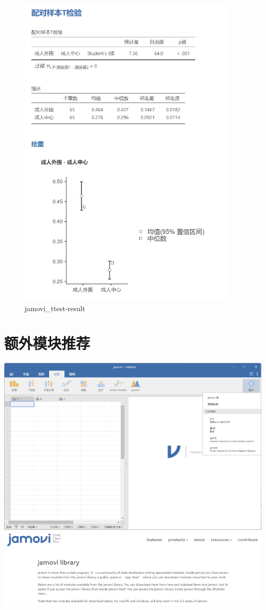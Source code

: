 \documentclass[
]{book}
\begin{document}
\begin{figure}
\centering
\includegraphics{img/jamovi/ttest-results.png}
\caption{jamovi\_ttest-result}
\end{figure}

\section{额外模块推荐}\label{ux989dux5916ux6a21ux5757ux63a8ux8350}

\includegraphics{img/jamovi/modules.png}\\
\includegraphics{img/jamovi/modules-library.png}
\end{document}
